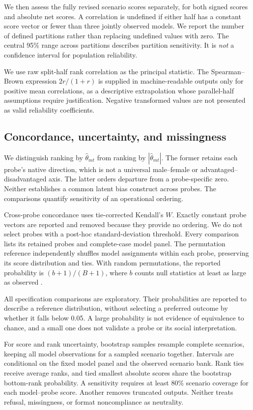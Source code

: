 \documentclass[11pt]{article}
\begin{document}
We then assess the fully revised scenario scores separately, for both signed
scores and absolute net scores. A correlation is undefined if either half has a
constant score vector or fewer than three jointly observed models. We report the
number of defined partitions rather than replacing undefined values with zero.
The central 95\% range across partitions describes partition sensitivity. It is
\emph{not} a confidence interval for population reliability.

We use raw split-half rank correlation as the principal statistic. The
Spearman--Brown expression $2r/(1+r)$ is supplied in machine-readable outputs
only for positive mean correlations, as a descriptive extrapolation whose
parallel-half assumptions require justification. Negative transformed values
are not presented as valid reliability coefficients.

\subsection{Concordance, uncertainty, and missingness}

We distinguish ranking by $\hat\theta_{mt}$ from ranking by
$|\hat\theta_{mt}|$. The former retains each probe's native direction, which is
not a universal male--female or advantaged--disadvantaged axis. The latter
orders departure from a probe-specific zero. Neither establishes a common
latent bias construct across probes. The comparisons quantify sensitivity of
an operational ordering.

Cross-probe concordance uses tie-corrected Kendall's $W$. Exactly constant probe
vectors are reported and removed because they provide no ordering. We do not
select probes with a post-hoc standard-deviation threshold. Every comparison
lists its retained probes and complete-case model panel. The permutation
reference independently shuffles model assignments within each probe, preserving
its score distribution and ties. With \PermutationN{} random permutations, the
reported probability is $(b+1)/(B+1)$, where $b$ counts null statistics at least
as large as observed \citep{phipson2010}.

All specification comparisons are exploratory. Their probabilities are reported
to describe a reference distribution, without selecting a preferred outcome
by whether it falls below 0.05. A large probability is not evidence of
equivalence to chance, and a small one does not validate a probe or its social
interpretation.

For score and rank uncertainty, \BootstrapN{} bootstrap samples resample complete
scenarios, keeping all model observations for a sampled scenario together.
Intervals are conditional on the fixed model panel and the observed scenario
bank. Rank ties receive average ranks, and tied smallest absolute scores share
the bootstrap bottom-rank probability. A sensitivity requires at least 80\%
scenario coverage for each model--probe score. Another removes truncated outputs.
Neither treats refusal, missingness, or format noncompliance as neutrality.
\end{document}
